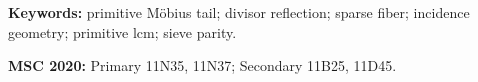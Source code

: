 \documentclass[11pt]{article}
\theoremstyle{definition}
\theoremstyle{remark}
\begin{document}
\noindent\textbf{Keywords:} primitive M\"obius tail; divisor
reflection; sparse fiber; incidence geometry; primitive lcm; sieve
parity.

\medskip
\noindent\textbf{MSC 2020:} Primary 11N35, 11N37; Secondary
11B25, 11D45.











\clearpage
\begingroup
\footnotesize


\endgroup
\end{document}
